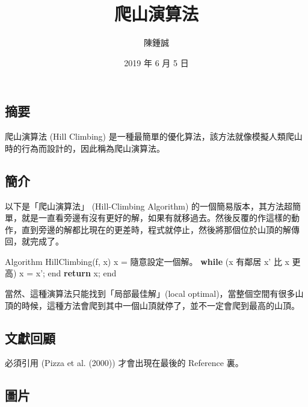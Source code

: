 \documentclass[
  a4paperpaper,
]{article}
\title{爬山演算法}
\author{陳鍾誠}
\date{2019 年 6 月 5 日}
\newenvironment{Shaded}{}{}
\newcommand{\AttributeTok}[1]{\textcolor[rgb]{0.49,0.56,0.16}{#1}}
\newcommand{\ControlFlowTok}[1]{\textcolor[rgb]{0.00,0.44,0.13}{\textbf{#1}}}
\newcommand{\NormalTok}[1]{#1}
\newcommand{\OperatorTok}[1]{\textcolor[rgb]{0.40,0.40,0.40}{#1}}
\newcommand{\StringTok}[1]{\textcolor[rgb]{0.25,0.44,0.63}{#1}}
\begin{document}
\maketitle

\hypertarget{ux6458ux8981}{%
\subsection{摘要}\label{ux6458ux8981}}

爬山演算法 (Hill Climbing)
是一種最簡單的優化算法，該方法就像模擬人類爬山時的行為而設計的，因此稱為爬山演算法。

\hypertarget{ux7c21ux4ecb}{%
\subsection{簡介}\label{ux7c21ux4ecb}}

以下是「爬山演算法」 (Hill-Climbing Algorithm)
的一個簡易版本，其方法超簡單，就是一直看旁邊有沒有更好的解，如果有就移過去。然後反覆的作這樣的動作，直到旁邊的解都比現在的更差時，程式就停止，然後將那個位於山頂的解傳回，就完成了。

\begin{Shaded}
\begin{Highlighting}[]
\NormalTok{Algorithm }\AttributeTok{HillClimbing}\NormalTok{(f}\OperatorTok{,}\NormalTok{ x)}
\NormalTok{  x }\OperatorTok{=}\NormalTok{ 隨意設定一個解。}
  \ControlFlowTok{while}\NormalTok{ (x 有鄰居 x}\StringTok{' 比 x 更高)}
\NormalTok{    x }\OperatorTok{=}\NormalTok{ x}\StringTok{';}
\NormalTok{  end}
  \ControlFlowTok{return}\NormalTok{ x}\OperatorTok{;}
\NormalTok{end}
\end{Highlighting}
\end{Shaded}

當然、這種演算法只能找到「局部最佳解」(local
optimal)，當整個空間有很多山頂的時候，這種方法會爬到其中一個山頂就停了，並不一定會爬到最高的山頂。

\hypertarget{ux6587ux737bux56deux9867}{%
\subsection{文獻回顧}\label{ux6587ux737bux56deux9867}}

必須引用 (Pizza et al. (2000)) 才會出現在最後的 Reference 裏。

\hypertarget{ux5716ux7247}{%
\subsection{圖片}\label{ux5716ux7247}}
\end{document}
